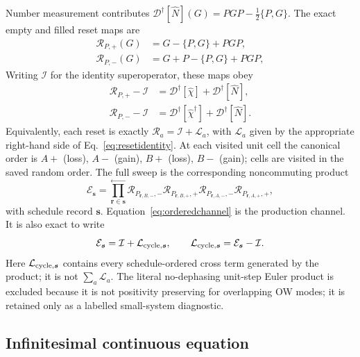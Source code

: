 \documentclass[aps,prb,twocolumn,nofootinbib,superscriptaddress,floatfix]{revtex4-2}
\newcommand{\Diss}{\mathcal D}
\begin{document}
Number measurement contributes
$\Diss^\dagger[\hat N](G)=PGP-\tfrac12\{P,G\}$.  The exact empty and filled reset
maps are
\begin{align}
 \mathcal R_{P,+}(G)&=G-\{P,G\}+PGP,\\
 \mathcal R_{P,-}(G)&=G+P-\{P,G\}+PGP,
 \label{eq:localdeph}
\end{align}
Writing $\mathcal I$ for the identity superoperator, these maps obey
\begin{align}
 \mathcal R_{P,+}-\mathcal I
 &=\Diss^\dagger[\hat\chi]+\Diss^\dagger[\hat N],\\
 \mathcal R_{P,-}-\mathcal I
 &=\Diss^\dagger[\hat\chi^\dagger]+\Diss^\dagger[\hat N].
 \label{eq:resetidentity}
\end{align}
Equivalently, each reset is exactly
$\mathcal R_a=\mathcal I+\mathcal L_a$, with $\mathcal L_a$ given by the
appropriate right-hand side of Eq.~\eqref{eq:resetidentity}.
At each visited unit cell the canonical order is $A+$ (loss), $A-$ (gain), $B+$
(loss), $B-$ (gain); cells are visited in the saved random order.  The full sweep is
the corresponding noncommuting product
\begin{equation}
 \mathcal E_{\boldsymbol s}=
 \prod_{\boldsymbol r\in\boldsymbol s}^{\longleftarrow}
 \mathcal R_{P_{\boldsymbol r,B,-},-}
 \mathcal R_{P_{\boldsymbol r,B,+},+}
 \mathcal R_{P_{\boldsymbol r,A,-},-}
 \mathcal R_{P_{\boldsymbol r,A,+},+},
 \label{eq:orderedchannel}
\end{equation}
with schedule record $\boldsymbol s$.  Equation~\eqref{eq:orderedchannel} is the
production channel.  It is also exact to write
\begin{equation}
 \mathcal E_{\boldsymbol s}=\mathcal I+\mathcal L_{{\rm cycle},\boldsymbol s},
 \qquad
 \mathcal L_{{\rm cycle},\boldsymbol s}
 =\mathcal E_{\boldsymbol s}-\mathcal I.
 \label{eq:cycleL}
\end{equation}
Here $\mathcal L_{{\rm cycle},\boldsymbol s}$ contains every schedule-ordered cross
term generated by the product; it is not $\sum_a\mathcal L_a$.  The literal
no-dephasing unit-step Euler product is excluded
because it is not positivity preserving for overlapping OW modes; it is retained only
as a labelled small-system diagnostic.

\subsection{Infinitesimal continuous equation}
\end{document}

